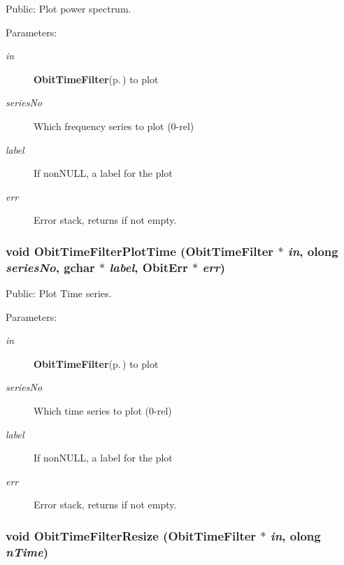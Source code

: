 Public: Plot power spectrum. 

\begin{Desc}
\item[Parameters:]
\begin{description}
\item[{\em in}]{\bf Obit\-Time\-Filter}{\rm (p.\,\pageref{structObitTimeFilter})} to plot \item[{\em series\-No}]Which frequency series to plot (0-rel) \item[{\em label}]If non\-NULL, a label for the plot \item[{\em err}]Error stack, returns if not empty. \end{description}
\end{Desc}
\subsubsection{\setlength{\rightskip}{0pt plus 5cm}void Obit\-Time\-Filter\-Plot\-Time ({\bf Obit\-Time\-Filter} $\ast$ {\em in}, {\bf olong} {\em series\-No}, gchar $\ast$ {\em label}, {\bf Obit\-Err} $\ast$ {\em err})}\label{ObitTimeFilter_8c_a17}


Public: Plot Time series. 

\begin{Desc}
\item[Parameters:]
\begin{description}
\item[{\em in}]{\bf Obit\-Time\-Filter}{\rm (p.\,\pageref{structObitTimeFilter})} to plot \item[{\em series\-No}]Which time series to plot (0-rel) \item[{\em label}]If non\-NULL, a label for the plot \item[{\em err}]Error stack, returns if not empty. \end{description}
\end{Desc}
\subsubsection{\setlength{\rightskip}{0pt plus 5cm}void Obit\-Time\-Filter\-Resize ({\bf Obit\-Time\-Filter} $\ast$ {\em in}, {\bf olong} {\em n\-Time})}\label{ObitTimeFilter_8c_a9}


